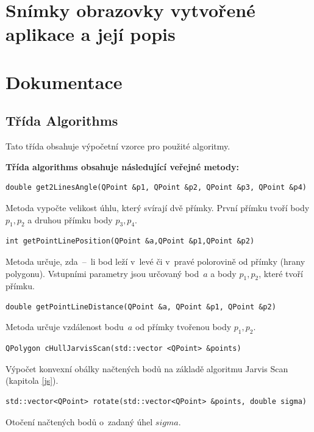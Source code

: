 \documentclass[a4paper, 12pt, oneside, titlepage]{article} %
\begin{document}
\section{Snímky obrazovky vytvořené aplikace a její popis}



\section{Dokumentace}
\subsection{Třída Algorithms}
Tato třída obsahuje výpočetní vzorce pro použité algoritmy.

\textbf{Třída algorithms obsahuje následující veřejné metody:}

\begin{verbatim}
double get2LinesAngle(QPoint &p1, QPoint &p2, QPoint &p3, QPoint &p4)
\end{verbatim}
Metoda vypočte velikost úhlu, který svírají dvě přímky. První přímku tvoří body $p_1, p_2$ a druhou přímku body $p_3, p_4$.\\

\begin{verbatim}
int getPointLinePosition(QPoint &a,QPoint &p1,QPoint &p2)
\end{verbatim}
Metoda určuje, zda~--~li bod leží v~levé či v~pravé polorovině od přímky (hrany polygonu). Vstupními parametry jsou určovaný bod~$a$ a body $p_1, p_2$, které tvoří přímku.\\

\begin{verbatim}
double getPointLineDistance(QPoint &a, QPoint &p1, QPoint &p2)
\end{verbatim}
Metoda určuje vzdálenost bodu~$a$ od přímky tvořenou body $p_1, p_2$.\\

\begin{verbatim}
QPolygon cHullJarvisScan(std::vector <QPoint> &points)
\end{verbatim}
Výpočet konvexní obálky načtených bodů na základě algoritmu Jarvis Scan (kapitola \ref{js}).\\

\begin{verbatim}
std::vector<QPoint> rotate(std::vector<QPoint> &points, double sigma)
\end{verbatim}
Otočení načtených bodů o~zadaný úhel $sigma$.\\
\end{document}

